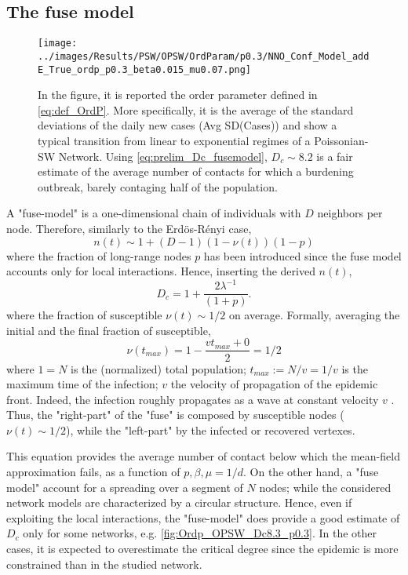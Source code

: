 \documentclass[a4paper,10pt,twoside]{book} %
\theoremstyle{definition}
\begin{document}
\subsection*{The fuse model}
\label{sec:simple_D_c_fuse_model}
\begin{figure}[t]
	\texttt{[image: ../images/Results/PSW/OPSW/OrdParam/p0.3/NNO\_Conf\_Model\_addE\_True\_ordp\_p0.3\_beta0.015\_mu0.07.png]}
	\centering
	\caption{In the figure, it is reported the order parameter defined in \autoref{eq:def_OrdP}. More specifically, it is the average of the standard deviations of the daily new cases (Avg SD(Cases)) and show a typical transition from linear to exponential regimes of a Poissonian-SW Network. Using \autoref{eq:prelim_Dc_fusemodel}, $D_c \sim 8.2$ is a fair estimate of the average number of contacts for which a burdening outbreak, barely contaging half of the population.}
	\label{fig:SD_Threshold_Fuse_Model}
\end{figure}
A "fuse-model" is a one-dimensional chain of individuals with $D$ neighbors per node.
Therefore, similarly to the Erdös-Rényi case, 
\begin{equation}
	n(t) \sim 1+ (D-1)(1-\nu(t))(1-p)
	\label{eq:n(t)_fusemodel}
\end{equation}
where the fraction of long-range nodes $ p$ has been introduced since the fuse model accounts only for local interactions. 
Hence, inserting the derived $ n(t)$,
\begin{equation}
	D_c = 1 + \frac{2 \lambda^{-1}}{(1+p)}.
	\label{eq:simple_Dc_fusemodel}
\end{equation} 
where the fraction of susceptible $ \nu(t) \sim 1/2$ on average.  
Formally, averaging the initial and the final fraction of susceptible, 
\begin{equation}
	\nu(t_{max}) = 1-\frac{vt_{max}+0}{2} = 1/2
\end{equation}
where $1 = N$ is the (normalized) total population; $ t_{max}:= N/v = 1/v$ is the maximum time of the infection; $v$ the velocity of propagation of the epidemic front.  
Indeed, the infection roughly propagates as a wave at constant velocity $v$ . Thus, the "right-part" of the "fuse" is composed by susceptible nodes ($\nu(t) \sim 1/2$), while the "left-part" by the infected or recovered vertexes.

This equation provides the average number of contact below which the mean-field approximation fails, as a function of $p,\beta,\mu = 1/d$. On the other hand, a "fuse model" account for a spreading over a segment of $N$ nodes; while the considered network models are characterized by a circular structure. Hence, even if exploiting the local interactions, the "fuse-model" does provide a good estimate of $ D_c$ only for some networks, e.g. \autoref{fig:Ordp_OPSW_Dc8.3_p0.3}. In the other cases, it is expected to overestimate the critical degree since the epidemic is more constrained than in the studied network.
\end{document}
